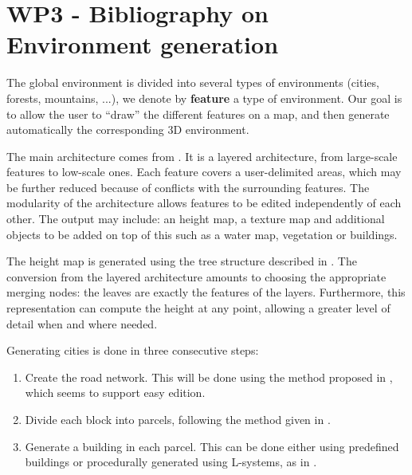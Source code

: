 \section{WP3 - Bibliography on Environment generation}
\label{WP3}
The global environment is divided into several types of environments (cities, forests, mountains, ...), we denote by \textbf{feature} a type of environment. Our goal is to allow the user to ``draw'' the different features on a map, and then generate automatically the corresponding 3D environment.

The main architecture comes from \cite{DeclarativeArchitecture}. It is a
layered architecture, from large-scale features to low-scale ones. Each feature
covers a user-delimited areas, which may be further reduced because of
conflicts with the surrounding features. The modularity of the architecture
allows features to be edited independently of each other. The output may
include: an height map, a texture map and additional objects to be added on top
of this such as a water map, vegetation or buildings.

The height map is generated using the tree structure described in
\cite{FeatureTree}. The conversion from the layered architecture amounts to
choosing the appropriate merging nodes: the leaves are exactly the features of
the layers. Furthermore, this representation can compute the height at any
point, allowing a greater level of detail when and where needed.

Generating cities is done in three consecutive steps:
\begin{enumerate}
  \item Create the road network. This will be done using the method proposed in
    \cite{StreetTensors}, which seems to support easy edition.
  \item Divide each block into parcels, following the method given in
    \cite{PGParcels}.
  \item Generate a building in each parcel. This can be done either using
    predefined buildings or procedurally generated using L-systems, as in
    \cite{FLSystem}.
\end{enumerate}
